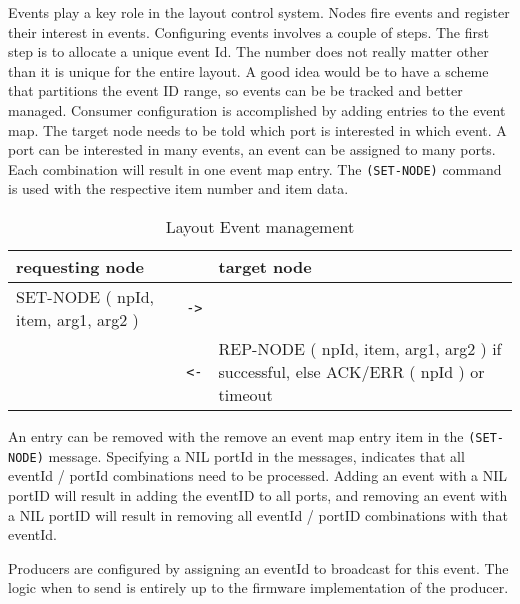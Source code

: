 Events play a key role in the layout control system. Nodes fire events and register their interest in events. Configuring events involves a couple of steps. The first step is to allocate a unique event Id. The number does not really matter other than it is unique for the entire layout. A good idea would be to have a scheme that partitions the event ID range, so events can be be tracked and better managed. Consumer configuration is accomplished by adding entries to the event map. The target node needs to be told which port is interested in which event. A port can be interested in many events, an event can be assigned to many ports. Each combination will result in one event map entry. The \texttt{(SET-NODE)} command is used with the respective item number and item data.

\begin{table}[ht!]
    \begin{center}
        \caption{Layout Event management}
        \begin{tabular}{|p{}| c |p{}|}
            \toprule
            \textbf{requesting node} & & \textbf{ target node} \\
            \midrule
            SET-NODE ( npId, item, arg1, arg2 ) & \texttt{->} &  \\
            \midrule
            & \texttt{<-} & REP-NODE ( npId, item, arg1, arg2 ) if successful, else ACK/ERR ( npId ) or timeout \\
            \bottomrule
        \end{tabular}
    \end{center}
\end{table}

An entry can be removed with the remove an event map entry item in the \texttt{(SET-NODE)} message. Specifying a NIL portId in the messages, indicates that all eventId / portId combinations need to be processed. Adding an event with a NIL portID will result in adding the eventID to all ports, and removing an event with a NIL portID will result in removing all eventId / portID combinations with that eventId.

Producers are configured by assigning an eventId to broadcast for this event. The logic when to send is entirely up to the firmware implementation of the producer.

